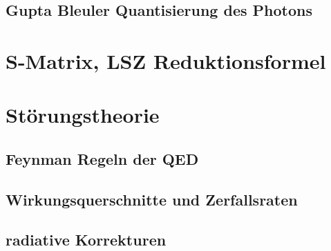 \documentclass{include/thesisclass}
\begin{document}
\section{Gupta Bleuler Quantisierung des Photons}

\chapter{S-Matrix, LSZ Reduktionsformel}

\chapter{Störungstheorie}	
\section{Feynman Regeln der QED}
\section{Wirkungsquerschnitte und Zerfallsraten}
\section{radiative Korrekturen}
\end{document}

